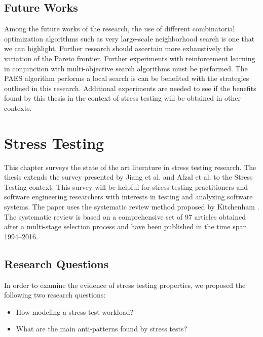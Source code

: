 \documentclass[espaco=umemeio,chapter=TITLE,twoside,openright]{abnt}
\begin{document}
\section{Future Works}

Among the future works of the research, the use of different combinatorial optimization algorithms such as very large-scale neighborhood search is one that we can highlight. Further research should ascertain more exhaustively the variation of the Pareto frontier. Further experiments with reinforcement learning in conjunction with multi-objective search algorithms must be performed. The PAES algorithm performs a local search is can be benefited with the strategies outlined in this research. Additional experiments are needed to see if the benefits found by this thesis in the context of stress testing will be obtained in other contexts.



\appendix





\chapter{Stress Testing}


This chapter surveys the state of the art literature in stress testing research. The thesis extends the survey presented by Jiang et al. \cite{Jiang2010}  and Afzal et al. \cite{Afzal2009a} to the Stress Testing context.  This survey will be helpful for stress testing practitioners and software engineering researchers with interests in testing and analyzing software systems. The paper uses the systematic review method proposed by Kitchenham \cite{Kitchenham2007}. The systematic review is based on a comprehensive set of 97 articles obtained after a multi-stage selection process and have been published in the time span 1994–2016.

\section{Research Questions}

In order to examine the evidence of stress testing properties, we proposed the following two research questions:


\begin{itemize}
\item How modeling a stress test workload?
\item What are the main anti-patterns found by stress tests?
\end{itemize}
\end{document}
